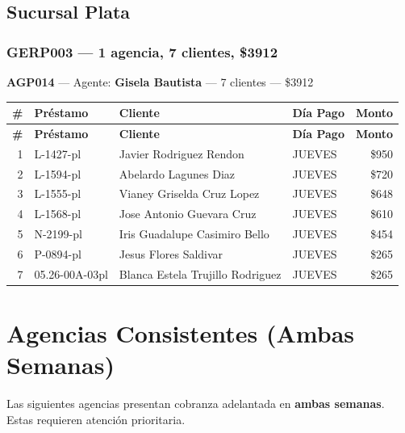 \documentclass[11pt,a4paper]{article}
\newcommand{\money}[1]{\$\num{#1}}
\begin{document}
\subsection{Sucursal Plata}

\subsubsection{GERP003 --- 1 agencia, 7 clientes, \money{3912}}

\noindent\textbf{AGP014} --- Agente: \textbf{Gisela Bautista} --- 7 clientes --- \money{3912}


\begin{center}
\renewcommand{\arraystretch}{1.1}
\footnotesize
\begin{longtable}{rlp{6.5cm}lr}
\toprule
\textbf{\#} & \textbf{Pr\'estamo} & \textbf{Cliente} & \textbf{D\'ia Pago} & \textbf{Monto} \\
\midrule
\endfirsthead
\toprule
\textbf{\#} & \textbf{Pr\'estamo} & \textbf{Cliente} & \textbf{D\'ia Pago} & \textbf{Monto} \\
\midrule
\endhead
1 & L-1427-pl & Javier Rodriguez Rendon & JUEVES & \money{950} \\
2 & L-1594-pl & Abelardo Lagunes Diaz & JUEVES & \money{720} \\
3 & L-1555-pl & Vianey Griselda Cruz Lopez & JUEVES & \money{648} \\
4 & L-1568-pl & Jose Antonio Guevara Cruz & JUEVES & \money{610} \\
5 & N-2199-pl & Iris Guadalupe Casimiro Bello & JUEVES & \money{454} \\
6 & P-0894-pl & Jesus Flores Saldivar & JUEVES & \money{265} \\
7 & 05.26-00A-03pl & Blanca Estela Trujillo Rodriguez & JUEVES & \money{265} \\

\bottomrule
\end{longtable}
\end{center}
\newpage

\section{Agencias Consistentes (Ambas Semanas)}

Las siguientes agencias presentan cobranza adelantada en \textbf{ambas semanas}.
Estas requieren atenci\'on prioritaria.
\end{document}
